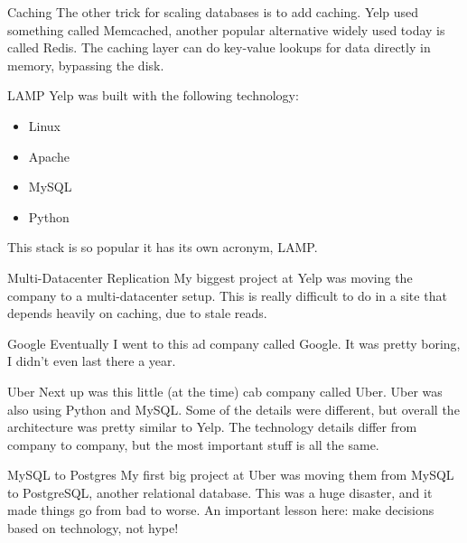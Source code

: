 \documentclass[14pt]{beamer}
\begin{document}
\begin{frame}{Caching}
  The other trick for scaling databases is to add caching. Yelp used something
  called Memcached, another popular alternative widely used today is called
  Redis.
  \newline
  \newline
  The caching layer can do key-value lookups for data directly in memory,
  bypassing the disk.
\end{frame}

\begin{frame}{LAMP}
  Yelp was built with the following technology:
  \begin{itemize}
  \item Linux
  \item Apache
  \item MySQL
  \item Python
  \end{itemize}
  This stack is so popular it has its own acronym, LAMP.
\end{frame}

\begin{frame}{Multi-Datacenter Replication}
  My biggest project at Yelp was moving the company to a multi-datacenter setup.
  \newline
  \newline
  This is really difficult to do in a site that depends heavily on caching, due
  to stale reads.
\end{frame}

\begin{frame}{Google}
  Eventually I went to this ad company called Google.
  \newline
  \newline
  It was pretty boring, I didn't even last there a year.
\end{frame}

\begin{frame}{Uber}
  Next up was this little (at the time) cab company called Uber.
  \newline
  \newline
  Uber was also using Python and MySQL. Some of the details were different, but
  overall the architecture was pretty similar to Yelp.
  \newline
  \newline
  The technology details differ from company to company, but the most important
  stuff is all the same.
\end{frame}

\begin{frame}{MySQL to Postgres}
  My first big project at Uber was moving them from MySQL to PostgreSQL, another
  relational database.
  \newline
  \newline
  This was a huge disaster, and it made things go from bad to worse. An
  important lesson here: make decisions based on technology, not hype!
\end{frame}
\end{document}
